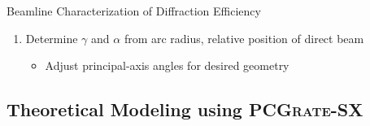 \documentclass[aspectratio=169,9pt]{beamer}
\begin{document}
\begin{frame}{Beamline Characterization of Diffraction Efficiency}
\begin{minipage}[t]{0.69\linewidth}
\begin{enumerate}
\begin{itemize}
    \item[$\square$] $y_n = L \sin (\Theta_n)$ using goniometric staging
  \end{itemize}
  \item Determine $\gamma$ and $\alpha$ from arc radius, relative position of direct beam
  \begin{itemize}
    \item[$\square$] Adjust principal-axis angles for desired geometry
  \end{itemize}
 \end{enumerate}
 \end{minipage}
\end{frame}

\subsection{Theoretical Modeling using \textsc{PCGrate-SX}}
\end{document}
